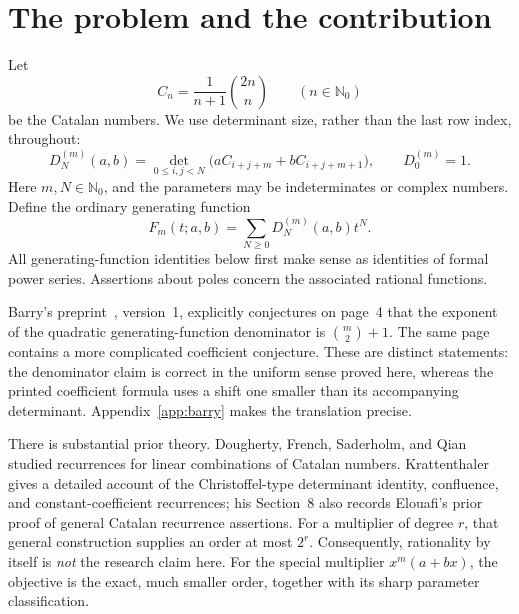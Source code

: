 \documentclass[11pt,a4paper]{article}
\numberwithin{equation}{section}
\theoremstyle{definition}
\theoremstyle{remark}
\newcommand{\NN}{\mathbb N_0}
\newcommand{\D}[2]{D_{#1}^{(#2)}}
\begin{document}
\clearpage
\begingroup
\small
\setlength{\parskip}{0pt}
\tableofcontents
\endgroup
\clearpage

\section{The problem and the contribution}\label{sec:problem}

Let
\begin{equation}\label{eq:catalan}
 C_n=\frac{1}{n+1}\binom{2n}{n}\qquad(n\in\NN)
\end{equation}
be the Catalan numbers.  We use determinant size, rather than the last row
index, throughout:
\begin{equation}\label{eq:D}
 \D{N}{m}(a,b)=\det_{0\leq i,j<N}
       \bigl(aC_{i+j+m}+bC_{i+j+m+1}\bigr),
 \qquad \D{0}{m}=1.
\end{equation}
Here $m,N\in\NN$, and the parameters may be indeterminates or complex
numbers.  Define the ordinary generating function
\begin{equation}\label{eq:F}
 F_m(t;a,b)=\sum_{N\geq0}\D{N}{m}(a,b)t^N.
\end{equation}
All generating-function identities below first make sense as identities of
formal power series.  Assertions about poles concern the associated
rational functions.

Barry's preprint~\cite{Barry2020}, version~1, explicitly conjectures on
page~4 that the exponent of the quadratic generating-function denominator
is $\binom m2+1$.  The same page contains a more complicated coefficient
conjecture.  These are distinct statements: the denominator claim is
correct in the uniform sense proved here, whereas the printed coefficient
formula uses a shift one smaller than its accompanying determinant.
Appendix~\ref{app:barry} makes the translation precise.

There is substantial prior theory.  Dougherty, French, Saderholm, and
Qian~\cite{Dougherty2011} studied recurrences for linear combinations of
Catalan numbers.  Krattenthaler~\cite{Krattenthaler2023} gives a detailed
account of the Christoffel-type determinant identity, confluence, and
constant-coefficient recurrences; his Section~8 also records Elouafi's
prior proof of general Catalan recurrence assertions.  For a multiplier
of degree $r$, that general construction supplies an order at most $2^r$.
Consequently, rationality by itself is \emph{not} the research claim here.
For the special multiplier $x^m(a+bx)$, the objective is the exact,
much smaller order, together with its sharp parameter classification.
\end{document}
